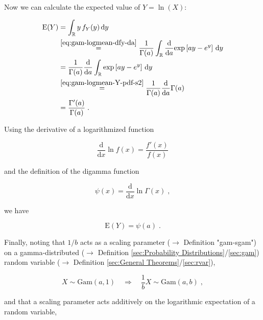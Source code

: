 \documentclass[a4paper,12pt,twoside]{book}
\begin{document}
Now we can calculate the expected value of $Y = \ln(X)$:

\begin{equation} \label{eq:gam-logmean-E-Y-s1}
\begin{split}
\mathrm{E}(Y) &= \int_{\mathbb{R}} y \, f_Y(y) \, \mathrm{d}y \\
&\overset{\eqref{eq:gam-logmean-dfy-da}}{=} \frac{1}{\Gamma(a)} \int_{\mathbb{R}} \frac{\mathrm{d}}{\mathrm{d}a} \mathrm{exp}\left[ ay - e^y \right] \, \mathrm{d}y \\
&= \frac{1}{\Gamma(a)} \frac{\mathrm{d}}{\mathrm{d}a} \int_{\mathbb{R}} \mathrm{exp}\left[ ay - e^y \right] \, \mathrm{d}y \\
&\overset{\eqref{eq:gam-logmean-Y-pdf-s2}}{=} \frac{1}{\Gamma(a)} \frac{\mathrm{d}}{\mathrm{d}a} \Gamma(a) \\
&= \frac{\Gamma'(a)}{\Gamma(a)} \; .
\end{split}
\end{equation}

Using the derivative of a logarithmized function

\begin{equation} \label{eq:gam-logmean-log-der}
\frac{\mathrm{d}}{\mathrm{d}x} \ln f(x) = \frac{f'(x)}{f(x)}
\end{equation}

and the definition of the digamma function

\begin{equation} \label{eq:gam-logmean-psi}
\psi(x) = \frac{\mathrm{d}}{\mathrm{d}x} \ln \Gamma(x) \; ,
\end{equation}

we have

\begin{equation} \label{eq:gam-logmean-E-Y-s2}
\mathrm{E}(Y) = \psi(a) \; .
\end{equation}

Finally, noting that $1/b$ acts as a scaling parameter ($\rightarrow$ Definition "gam-sgam") on a gamma-distributed ($\rightarrow$ Definition \ref{sec:Probability Distributions}/\ref{sec:gam}) random variable ($\rightarrow$ Definition \ref{sec:General Theorems}/\ref{sec:rvar}),

\begin{equation} \label{eq:gam-logmean-gam-sgam}
X \sim \mathrm{Gam}(a,1) \quad \Rightarrow \quad \frac{1}{b} X \sim \mathrm{Gam}(a,b) \; ,
\end{equation}

and that a scaling parameter acts additively on the logarithmic expectation of a random variable,
\end{document}
